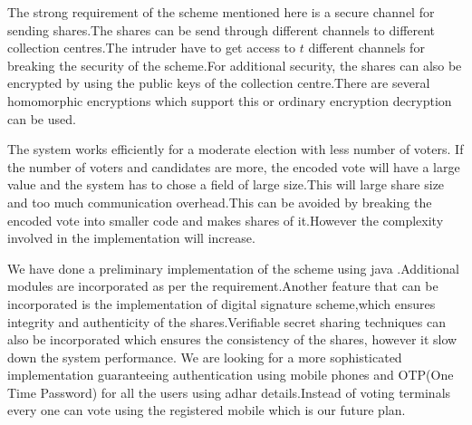 \documentclass[conference]{IEEEtran}
\begin{document}
The strong requirement of the scheme mentioned here is a secure channel for sending shares.The shares can be send through different channels to different collection centres.The intruder have to get access to $t$ different channels for breaking the security of the scheme.For additional security, the shares can also be encrypted by using the public keys of the collection centre.There are several homomorphic encryptions which support this or ordinary encryption decryption can be used.

The system works efficiently for a moderate election with less number of voters.
If the number of voters and candidates are more, the encoded vote will have a large value and the system has to chose a field of large size.This will large share size and too much communication overhead.This can be avoided by breaking the encoded vote into smaller code and makes shares of it.However the complexity involved in the implementation will increase.

We have done a preliminary implementation of the scheme using java \cite{nair2015improved}.Additional modules are incorporated as per the requirement.Another feature that can be incorporated is the implementation of digital signature scheme,which ensures integrity and authenticity of the shares.Verifiable secret sharing techniques can also be incorporated which ensures the consistency of the shares, however it slow down the system performance. We are looking for a more sophisticated implementation guaranteeing authentication using mobile phones and OTP(One Time Password) for all the users using adhar details.Instead of voting terminals every one can vote using the registered mobile which is our future plan.
\end{document}

